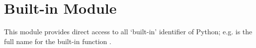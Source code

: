 \section{Built-in Module }

This module provides direct access to all `built-in' identifier of
Python; e.g.  is the full name for the built-in
function .
